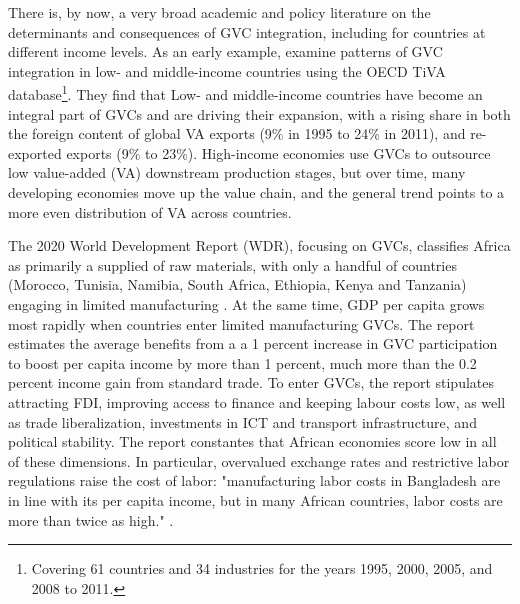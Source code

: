 \documentclass[a4paper]{article}
\begin{document}
There is, by now, a very broad academic and policy literature on the determinants and consequences of GVC integration, including for countries at different income levels. As an early example, \citet{Kummritz20162} examine patterns of GVC integration in low- and middle-income countries using the OECD TiVA database\footnote{Covering 61 countries and 34 industries for the years 1995, 2000, 2005, and 2008 to 2011.}. They find that %
Low- and middle-income countries have become an integral part of GVCs and are driving their expansion, with a rising share in both the foreign content of global VA exports (9\% in 1995 to 24\% in 2011), and re-exported exports (9\% to 23\%). High-income economies use GVCs to outsource low value-added (VA) downstream production stages, but over time, many developing economies move up the value chain, and the general trend points to a more even distribution of VA across countries. \newline %

The 2020 World Development Report (WDR), focusing on GVCs, classifies Africa as primarily a supplied of raw materials, with only a handful of countries (Morocco, Tunisia, Namibia, South Africa, Ethiopia, Kenya and Tanzania) engaging in limited manufacturing \citep{world2020trading}. At the same time, GDP per capita grows most rapidly when countries enter limited manufacturing GVCs. The report estimates the average benefits from a a 1 percent increase in GVC participation to boost per capita income by more than 1 percent, much more than the 0.2 percent income gain from standard trade. To enter GVCs, the report stipulates attracting FDI, improving access to finance and keeping labour costs low, as well as trade liberalization, investments in ICT and transport infrastructure, and political stability. The report constantes that African economies score low in all of these dimensions. In particular, overvalued exchange rates and restrictive labor
regulations raise the cost of labor: "manufacturing labor costs in Bangladesh are in line with its per capita income, but in many African countries, labor costs are more than twice as high." \citep{world2020trading}. \newline
\end{document}
